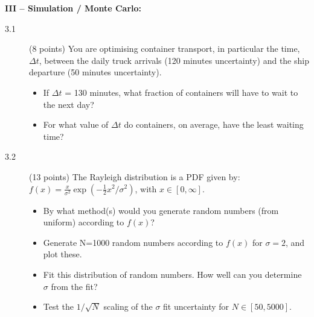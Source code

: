 \documentclass[11pt]{article}
\begin{document}

\noindent
{\bf III -- Simulation / Monte Carlo:}
\begin{description}
  \item[3.1] (8 points)
    You are optimising container transport, in particular the time, $\Delta t$, between the
    daily truck arrivals (120 minutes uncertainty) and the ship departure (50 minutes uncertainty).
  \vspace*{-1ex}
  \begin{itemize}
    \item If $\Delta t$ = 130 minutes, what fraction of containers will have to wait to the next day?
    \item For what value of $\Delta t$ do containers, on average, have the least waiting time?
  \end{itemize}
%
  \item[3.2] (13 points)
    The Rayleigh distribution is a PDF given by: $f(x) = \frac{x}{\sigma^2} \exp(-\frac{1}{2}x^2/\sigma^2)$,
    with $x \in [0,\infty]$.
  \vspace*{-4ex}
  \begin{itemize}
    \item By what method(s) would you generate random numbers (from uniform) according to $f(x)$?
    \item Generate N=1000 random numbers according to $f(x)$ for $\sigma = 2$, and plot these.
    \item Fit this distribution of random numbers. How well can you determine $\sigma$ from the fit?
    \item Test the $1/\sqrt{N}$ scaling of the $\sigma$ fit uncertainty for $N \in [50,5000]$.
  \end{itemize}
\end{description}


\end{document}
